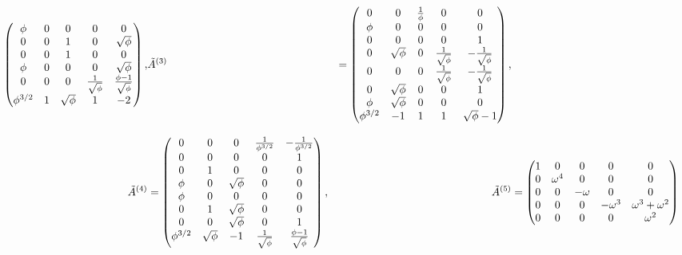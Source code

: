 \begin{align}
\begin{pmatrix}
    \phi & 0 & 0 & 0 & 0 \\
    0 & 0 & 1 & 0 & \sqrt{\phi} \\
    0 & 0 & 1 & 0 & 0 \\
    \phi & 0 & 0 & 0 & \sqrt{\phi} \\
    0 & 0 & 0 & \frac{1}{\sqrt{\phi}} & \frac{\phi-1}{\sqrt{\phi}} \\
    \phi^{3/2} & 1 & \sqrt{\phi} & 1 & -2 \\
  \end{pmatrix}, &
  \tilde{A}^{(3)} &= \begin{pmatrix}
    0 & 0 & \frac{1}{\phi} & 0 & 0 \\
    \phi & 0 & 0 & 0 & 0 \\
    0 & 0 & 0 & 0 & 1 \\
    0 & \sqrt{\phi} & 0 & \frac{1}{\sqrt{\phi}} & -\frac{1}{\sqrt{\phi}} \\
    0 & 0 & 0 & \frac{1}{\sqrt{\phi}} & -\frac{1}{\sqrt{\phi}} \\
    0 & \sqrt{\phi} & 0 & 0 & 1 \\
    \phi & \sqrt{\phi} & 0 & 0 & 0 \\
    \phi^{3/2} & -1 & 1 & 1 & \sqrt{\phi}-1 \\
  \end{pmatrix}, \notag \\[2ex]
  \tilde{A}^{(4)} &= \begin{pmatrix}
    0 & 0 & 0 & \frac{1}{\phi^{3/2}} & -\frac{1}{\phi^{3/2}} \\
    0 & 0 & 0 & 0 & 1 \\
    0 & 1 & 0 & 0 & 0 \\
    \phi & 0 & \sqrt{\phi} & 0 & 0 \\
    \phi & 0 & 0 & 0 & 0 \\
    0 & 1 & \sqrt{\phi} & 0 & 0 \\
    0 & 0 & \sqrt{\phi} & 0 & 1 \\
    \phi^{3/2} & \sqrt{\phi} & -1 & \frac{1}{\sqrt{\phi}} & \frac{\phi-1}{\sqrt{\phi}} \\
  \end{pmatrix}, &
  \tilde{A}^{(5)} &= \begin{pmatrix}
    1 & 0 & 0 & 0 & 0 \\
    0 & \omega^4 & 0 & 0 & 0 \\
    0 & 0 & -\omega & 0 & 0 \\
    0 & 0 & 0 & -\omega^3 & \omega^3+\omega^2 \\
    0 & 0 & 0 & 0 & \omega^2 \\

\end{pmatrix}
\end{align}
